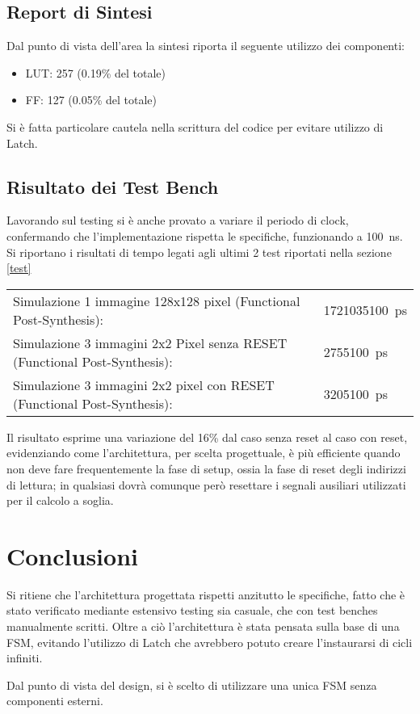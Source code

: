 \documentclass{article}
\begin{document}
\subsection{Report di Sintesi}

Dal punto di vista dell'area la sintesi riporta il seguente utilizzo dei componenti:
\begin{itemize}
\item LUT: 257 (0.19\% del totale)
\item FF: 127 (0.05\% del totale)
\end{itemize}
Si è fatta particolare cautela nella scrittura del codice per evitare utilizzo di Latch.

\subsection{Risultato dei Test Bench}

Lavorando sul testing si è anche provato a variare il periodo di clock, confermando che l'implementazione rispetta le specifiche, funzionando a \SI{100}{\ns}.\\

Si riportano i risultati di tempo legati agli ultimi 2 test riportati nella sezione \ref{test}\\

\begin{tabular}{ll}
Simulazione 1 immagine 128x128 pixel (Functional Post-Synthesis): & \SI{1721035100}{\ps}\\
Simulazione 3 immagini 2x2 Pixel senza RESET (Functional Post-Synthesis): & \SI{2755100}{\ps}\\
Simulazione 3 immagini 2x2 pixel con RESET (Functional Post-Synthesis):& \SI{3205100}{\ps}\\
\end{tabular}

\bigskip
Il risultato esprime una variazione del 16\% dal caso senza reset al caso con reset, evidenziando come l'architettura, per scelta progettuale,
è più efficiente quando non deve fare frequentemente la fase di setup, ossia la fase di reset degli indirizzi di lettura; in qualsiasi dovrà comunque però resettare i segnali ausiliari utilizzati per il calcolo a soglia.


\section{Conclusioni}

Si ritiene che l'architettura progettata rispetti anzitutto le specifiche, fatto che è stato verificato mediante estensivo testing sia casuale, che con test benches
manualmente scritti. Oltre a ciò l'architettura è stata pensata sulla base di una FSM, evitando l'utilizzo di Latch che avrebbero potuto creare l'instaurarsi di cicli infiniti.

Dal punto di vista del design, si è scelto di utilizzare una unica FSM senza componenti esterni.

\end{document}
